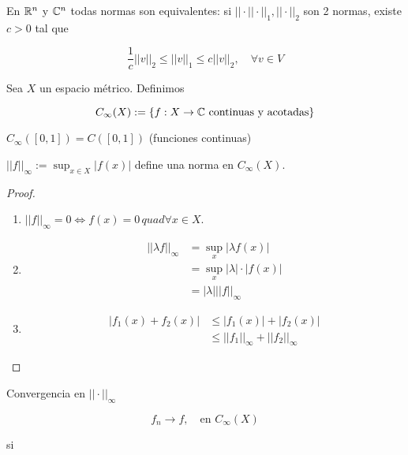 \documentclass[../Apunte.tex]{subfiles}
\begin{document}
\begin{fproposition}

En $\mathbb{R}^n$ y $\mathbb{C}^n$ todas normas son equivalentes: si $||\cdot||\cdot||_1,||\cdot||_2$ son 2 normas, existe $c>0$ tal que

\[\frac{1}{c}||v||_2\leq ||v||_1\leq c||v||_2,\quad \forall v\in V\]

\end{fproposition}

\begin{fdefinition}
    Sea $X$ un espacio métrico. Definimos 

    \[C_\infty(X):=\{f:X\to\mathbb{C}\text{ continuas y acotadas}\}\]

\end{fdefinition}

\begin{fexample}
    $C_\infty([0,1]) = C([0,1])$ (funciones continuas)
\end{fexample}

\begin{fproposition}
    $||f||_\infty:=\sup_{x\in X}|f(x)|$ define una norma en $C_\infty(X)$.
\end{fproposition}

\begin{proof}
    \begin{enumerate}
        \item $||f||_\infty=0\iff f(x)=0\, quad \forall x\in X$.

        \item \begin{align*}||\lambda f||_\infty&=\sup_x |\lambda f(x)|\\
            &=\sup_x |\lambda|\cdot |f(x)|\\
            &=|\lambda| ||f||_\infty
        \end{align*}

        \item \begin{align*}
            |f_1(x)+f_2(x)|&\leq |f_1(x)|+|f_2(x)|\\
            &\leq ||f_1||_\infty+||f_2||_\infty
        \end{align*}
    \end{enumerate}
\end{proof}

Convergencia en $||\cdot||_\infty$

\[f_n\to f,\quad \text{en }C_\infty(X)\]

si 
\end{document}
